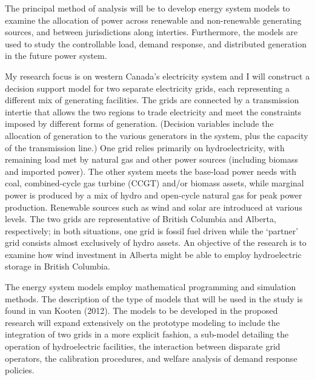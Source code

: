 

\label{research-methods}


\newlength{\savedunitlength}
\setlength{\unitlength}{2em}


The principal method of analysis will be to develop energy system models
to examine the allocation of power across renewable and non-renewable
generating sources, and between jurisdictions along interties.
Furthermore, the models are used to study the controllable load, demand
response, and distributed generation in the future power system.

My research focus is on western Canada's electricity system and I will
construct a decision support model for two separate electricity grids,
each representing a different mix of generating facilities. The grids
are connected by a transmission intertie that allows the two regions to
trade electricity and meet the constraints imposed by different forms of
generation. (Decision variables include the allocation of generation to
the various generators in the system, plus the capacity of the
transmission line.) One grid relies primarily on hydroelectricity, with
remaining load met by natural gas and other power sources (including
biomass and imported power). The other system meets the base-load power
needs with coal, combined-cycle gas turbine (CCGT) and/or biomass
assets, while marginal power is produced by a mix of hydro and
open-cycle natural gas for peak power production. Renewable sources such
as wind and solar are introduced at various levels. The two grids are
representative of British Columbia and Alberta, respectively; in both
situations, one grid is fossil fuel driven while the `partner' grid
consists almost exclusively of hydro assets. An objective of the
research is to examine how wind investment in Alberta might be able to
employ hydroelectric storage in British Columbia.

The energy system models employ mathematical programming and simulation
methods. The description of the type of models that will be used in the
study is found in van Kooten (2012). The models to be developed in the
proposed research will expand extensively on the prototype modeling to
include the integration of two grids in a more explicit fashion, a
sub-model detailing the operation of hydroelectric facilities, the
interaction between disparate grid operators, the calibration
procedures, and welfare analysis of demand response policies.

